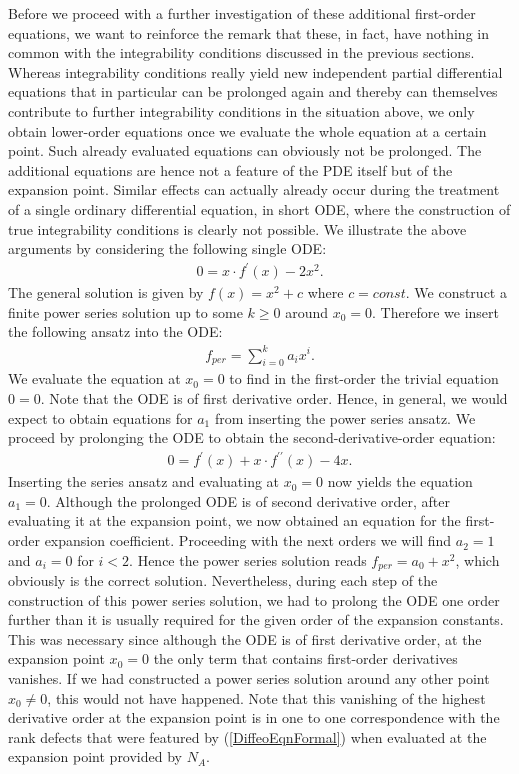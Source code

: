 Before we proceed with a further investigation of these additional first-order equations, we want to reinforce the remark that these, in fact, have nothing in common with the integrability conditions discussed in the previous sections. Whereas integrability conditions really yield new independent partial differential equations that in particular can be prolonged again and thereby can themselves contribute to further integrability conditions in the situation above, we only obtain lower-order equations once we evaluate the whole equation at a certain point. Such already evaluated equations can obviously not be prolonged. The additional equations are hence not a feature of the PDE itself but of the expansion point. Similar effects can actually already occur during the treatment of a single ordinary differential equation, in short ODE, where the construction of true integrability conditions is clearly not possible. We illustrate the above arguments by considering the following single ODE:
\begin{align}
    0 = x \cdot f^{\prime}(x) - 2x^2.
\end{align}
The general solution is given by $f(x) = x^2 +c$ where $c=const$. We construct a finite power series solution up to some $k \geq 0$ around $x_0 = 0$. Therefore we insert the following ansatz into the ODE:
\begin{align}
    f_{per} = \sum_{i=0}^k a_i x^i.
\end{align}
We evaluate the equation at $x_0=0$ to find in the first-order the trivial equation $0=0$. Note that the ODE is of first derivative order. Hence, in general, we would expect to obtain equations for $a_1$ from inserting the power series ansatz. We proceed by prolonging the ODE to obtain the second-derivative-order equation:
\begin{align}
    0 = f^{\prime}(x) + x \cdot f^{\prime \prime}(x) - 4 x.
\end{align}
Inserting the series ansatz and evaluating at $x_0=0$ now yields the equation $a_1=0$. Although the prolonged ODE is of second derivative order, after evaluating it at the expansion point, we now obtained an equation for the first-order expansion coefficient. Proceeding with the next orders we will find $a_2 = 1$ and $a_i = 0$ for $i < 2$. Hence the power series solution reads $f_{per} = a_0 + x^2$, which obviously is the correct solution. Nevertheless, during each step of the construction of this power series solution, we had to prolong the ODE one order further than it is usually required for the given order of the expansion constants. This was necessary since although the ODE is of first derivative order, at the expansion point $x_0=0$ the only term that contains first-order derivatives vanishes. If we had constructed a power series solution around any other point $x_0 \neq 0$, this would not have happened. Note that this vanishing of the highest derivative order at the expansion point is in one to one correspondence with the rank defects that were featured by (\ref{DiffeoEqnFormal}) when evaluated at the expansion point provided by $N_A$. 

